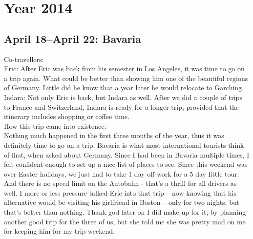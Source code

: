 \chapter{Year 2014}
\label{2014}

\section{April 18--April 22: Bavaria}
\label{2014:Germany}

Co-travellers: \\
Eric: After Eric was back from his semester in Los Angeles, it was time to go on a trip again. What could be better than showing him one of the beautiful regions of Germany. Little did he know that a year later he would relocate to Garching.\\
Indara: Not only Eric is back, but Indara as well. After we did a couple of trips to France and Switzerland, Indara is ready for a longer trip, provided that the itinerary includes shopping or coffee time.\\

How this trip came into existence:\\
Nothing much happened in the first three months of the year, thus it was definitely time to go on a trip. Bavaria is what most international tourists think of first, when asked about Germany. Since I had been in Bavaria multiple times, I felt confident enough to set up a nice list of places to see. Since this weekend was over Easter holidays, we just had to take 1 day off work for a 5 day little tour. And there is no speed limit on the Autobahn - that's a thrill for all drivers as well. I more or less pressure talked Eric into that trip -- now knowing that his alternative would be visiting his girlfriend in Boston -- only for two nights, but that's better than nothing. Thank god later on I did make up for it, by planning another good trip for the three of us, but she told me she was pretty mad on me for keeping him for my trip weekend.\\

